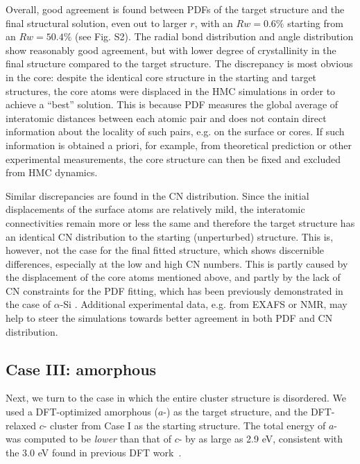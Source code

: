 Overall, good agreement is found between PDFs of the target structure and the final structural solution, even out to larger $r$, with an $Rw=0.6\%$ starting from an $Rw=50.4\%$ (see Fig. S2).   The radial bond distribution and angle distribution show reasonably  good agreement, but with lower degree of crystallinity in the final structure compared to the target structure. The discrepancy is most obvious in the core:  despite the identical core structure in the starting and target structures, the core atoms were displaced in the HMC simulations in order to achieve a ``best'' solution.  This is  because PDF measures the global average of interatomic distances between each atomic pair and does not contain direct information about the locality of such pairs, e.g. on the surface or cores. If such information is obtained a priori, for example, from theoretical prediction or other experimental measurements, the core structure can  then be fixed and excluded from HMC dynamics.

Similar discrepancies are found in the CN distribution. Since the initial displacements of the surface atoms are relatively mild, the interatomic connectivities remain more or less the same and therefore the target structure has an identical CN distribution to the starting (unperturbed) structure. This is, however, not the case for the final fitted structure, which shows discernible differences, especially at the low and high CN numbers. This is partly caused by the  displacement of the core atoms mentioned above, and partly by the lack of CN constraints  for the PDF fitting, which has been previously demonstrated in the case of  $\alpha$-Si \cite{Cliffe2010}. Additional experimental data, e.g. from EXAFS or NMR, may help to steer the simulations towards better agreement in both PDF and CN distribution.

\subsection{Case III: amorphous }
Next, we turn to the case in which the entire cluster structure is disordered. We used a DFT-optimized amorphous  ($a$-) as the target structure, and
 the DFT-relaxed $c$- cluster from Case I as the starting structure. The  total energy of $a$- was computed to be  {\em lower} than that of $c$- by as large as 2.9 eV, consistent with the 3.0 eV found in previous DFT work~\cite{DaSilva2010}.

